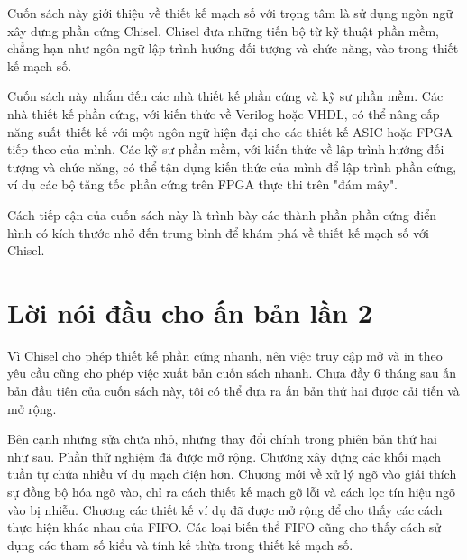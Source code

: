 \documentclass[%
    10pt,
    headinclude, footexclude,
    openright, %
    notitlepage,
    cleardoubleempty,
    headsepline,
    pointlessnumbers,
    bibtotoc, idxtotoc,
    ]{scrbook}
\begin{document}
Cuốn sách này giới thiệu về thiết kế mạch số với trọng tâm là sử dụng ngôn ngữ xây dựng phần cứng Chisel. Chisel đưa những tiến bộ từ kỹ thuật phần mềm, chẳng hạn như ngôn ngữ lập trình hướng đối tượng và chức năng, vào trong thiết kế mạch số.

Cuốn sách này nhắm đến các nhà thiết kế phần cứng và kỹ sư phần mềm. Các nhà thiết kế phần cứng, với kiến thức về Verilog hoặc VHDL, có thể nâng cấp năng suất thiết kế với một ngôn ngữ hiện đại cho các thiết kế ASIC hoặc FPGA tiếp theo của mình. Các kỹ sư phần mềm, với kiến thức về lập trình hướng đối tượng và chức năng, có thể tận dụng kiến thức của mình để lập trình phần cứng, ví dụ các bộ tăng tốc phần cứng trên FPGA thực thi trên "đám mây".

Cách tiếp cận của cuốn sách này là trình bày các thành phần phần cứng điển hình có kích thước nhỏ đến trung bình để khám phá về thiết kế mạch số với Chisel.




\section*{Lời nói đầu cho ấn bản lần 2}

Vì Chisel cho phép thiết kế phần cứng nhanh, nên việc truy cập mở và in theo yêu cầu cũng cho phép việc xuất bản cuốn sách nhanh. Chưa đầy 6 tháng sau ấn bản đầu tiên của cuốn sách này, tôi có thể đưa ra ấn bản thứ hai được cải tiến và mở rộng.

Bên cạnh những sửa chữa nhỏ, những thay đổi chính trong phiên bản thứ hai như sau. Phần thử nghiệm đã được mở rộng. Chương xây dựng các khối mạch tuần tự chứa nhiều ví dụ mạch điện hơn. Chương mới về xử lý ngõ vào giải thích sự đồng bộ hóa ngõ vào, chỉ ra cách thiết kế mạch gỡ lỗi và cách lọc tín hiệu ngõ vào bị nhiễu. Chương các thiết kế ví dụ đã được mở rộng để cho thấy các cách thực hiện khác nhau của FIFO. Các loại biến thể FIFO cũng cho thấy cách sử dụng các tham số kiểu và tính kế thừa trong thiết kế mạch số.
\end{document}
